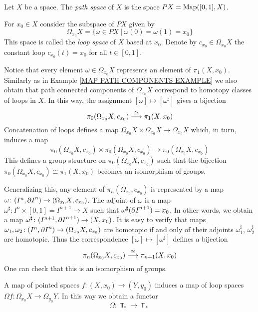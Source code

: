 \begin{example}
\label{LOOP SPACE EXAMPLE}
Let $X$ be a space. The \emph{path space} of $X$ is the space 
$PX = \mathrm{Map}([0, 1], X)$.

For $x_{0}\in X$ consider the subspace of $PX$ given by
\[
\Omega_{x_{0}}X = \{\omega \in PX \ | \ \omega(0) = \omega(1) = x_{0}\} 
\]
This space is called the \emph{loop space} of $X$ based at $x_{0}$. 
Denote by $c_{x_{0}}\in \Omega_{x_{0}}X$ the constant loop $c_{x_{0}}(t) = x_{0}$
for all $t\in [0, 1]$.

Notice that every element  $\omega\in\Omega_{x_{0}}X$ represents an element of 
$\pi_{1}(X, x_{0})$. Similarly as in Example \ref{MAP PATH COMPONENTS EXAMPLE} we also 
obtain that path connected components of $\Omega_{x_{0}}X$ correspond to homotopy classes 
of loops in $X$. In this way, the assignment $[\omega] \mapsto [\omega^{\sharp}]$
gives a bijection
\[
\pi_{0}(\Omega_{x_{0}}X, c_{x_{0}}) \overset{\cong}{\longrightarrow} \pi_{1}(X, x_{0})
\]
Concatenation of loops defines a map 
$\Omega_{x_{0}}X \times \Omega_{x_{0}}X \to  \Omega_{x_{0}}X$ which, in turn, 
induces a map 
\[
\pi_{0}(\Omega_{x_{0}}X, c_{x_{0}}) \times \pi_{0}(\Omega_{x_{0}}X, c_{x_{0}})
\to \pi_{0}(\Omega_{x_{0}}X, c_{x_{0}})
\]
This defines a group structure on $\pi_{0}(\Omega_{x_{0}}X, c_{x_{0}})$ such that 
the bijection $\pi_{0}(\Omega_{x_{0}}X, c_{x_{0}}) \cong \pi_{1}(X, x_{0})$
becomes an isomorphism of groups.


Generalizing this, any element of $\pi_{n}(\Omega_{x_{0}}, c_{x_{0}})$ is represented by a map 
$\omega \colon (I^{n}, {\partial I}^{n}) \to (\Omega_{x_{0}}X, c_{x_{0}})$. The adjoint 
of $\omega$ is a map $\omega^{\sharp} \colon I^{n}\times [0, 1] = I^{n+1} \to X$ 
such that $\omega^{\sharp}({\partial I}^{n+1}) = x_{0}$. In other words, we obtain a map 
$\omega^{\sharp}\colon (I^{n+1}, {\partial I}^{n+1}) \to (X, x_{0})$. It is easy to verify that maps 
$\omega_{1}, \omega_{2}\colon (I^{n}, {\partial I}^{n})\to (\Omega_{x_{0}}X, c_{x_{0}})$ 
are homotopic if and only of their adjoints $\omega_{1}^{\sharp}$, $\omega_{2}^{\sharp}$
are homotopic. Thus the correspondence $[\omega] \mapsto [\omega^{\sharp}]$ defines 
a bijection 
\[
\pi_{n}(\Omega_{x_{0}}X, c_{x_{0}}) \overset{\cong}{\longrightarrow} \pi_{n+1}(X, x_{0})
\]
One can check that this is an isomorphism of groups.
\end{example}

\begin{note}
A map of pointed spaces $f\colon (X, x_{0}) \to (Y, y_{0})$ induces a map 
of loop spaces $\Omega f \colon \Omega_{x_{0}}X \to \Omega_{y_{0}} Y$. In this 
way we obtain a functor 
\[
\Omega \colon \Top_{\ast} \to \Top_{\ast}
\]
\end{note}



